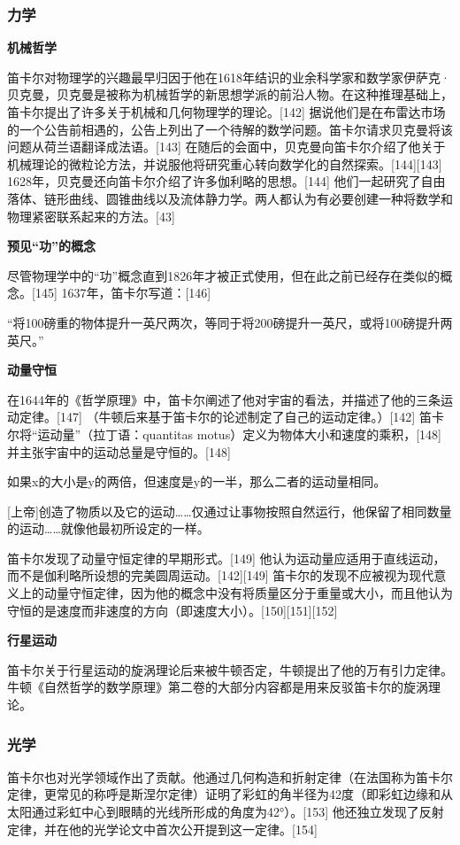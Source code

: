 \subsubsection{力学}

\textbf{机械哲学}

笛卡尔对物理学的兴趣最早归因于他在1618年结识的业余科学家和数学家伊萨克·贝克曼，贝克曼是被称为机械哲学的新思想学派的前沿人物。在这种推理基础上，笛卡尔提出了许多关于机械和几何物理学的理论。[142] 据说他们是在布雷达市场的一个公告前相遇的，公告上列出了一个待解的数学问题。笛卡尔请求贝克曼将该问题从荷兰语翻译成法语。[143] 在随后的会面中，贝克曼向笛卡尔介绍了他关于机械理论的微粒论方法，并说服他将研究重心转向数学化的自然探索。[144][143] 1628年，贝克曼还向笛卡尔介绍了许多伽利略的思想。[144] 他们一起研究了自由落体、链形曲线、圆锥曲线以及流体静力学。两人都认为有必要创建一种将数学和物理紧密联系起来的方法。[43]

\textbf{预见“功”的概念}

尽管物理学中的“功”概念直到1826年才被正式使用，但在此之前已经存在类似的概念。[145] 1637年，笛卡尔写道：[146]

“将100磅重的物体提升一英尺两次，等同于将200磅提升一英尺，或将100磅提升两英尺。”

\textbf{动量守恒}

在1644年的《哲学原理》中，笛卡尔阐述了他对宇宙的看法，并描述了他的三条运动定律。[147] （牛顿后来基于笛卡尔的论述制定了自己的运动定律。）[142] 笛卡尔将“运动量”（拉丁语：quantitas motus）定义为物体大小和速度的乘积，[148] 并主张宇宙中的运动总量是守恒的。[148]

如果x的大小是y的两倍，但速度是y的一半，那么二者的运动量相同。

[上帝]创造了物质以及它的运动……仅通过让事物按照自然运行，他保留了相同数量的运动……就像他最初所设定的一样。

笛卡尔发现了动量守恒定律的早期形式。[149] 他认为运动量应适用于直线运动，而不是伽利略所设想的完美圆周运动。[142][149] 笛卡尔的发现不应被视为现代意义上的动量守恒定律，因为他的概念中没有将质量区分于重量或大小，而且他认为守恒的是速度而非速度的方向（即速度大小）。[150][151][152]

\textbf{行星运动}

笛卡尔关于行星运动的旋涡理论后来被牛顿否定，牛顿提出了他的万有引力定律。牛顿《自然哲学的数学原理》第二卷的大部分内容都是用来反驳笛卡尔的旋涡理论。
\subsubsection{光学}
笛卡尔也对光学领域作出了贡献。他通过几何构造和折射定律（在法国称为笛卡尔定律，更常见的称呼是斯涅尔定律）证明了彩虹的角半径为42度（即彩虹边缘和从太阳通过彩虹中心到眼睛的光线所形成的角度为42°）。[153] 他还独立发现了反射定律，并在他的光学论文中首次公开提到这一定律。[154]
